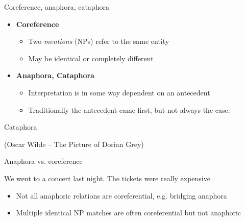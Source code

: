 \documentclass[dvipsnames, 10pt, compress]{beamer}
\begin{document}
\begin{frame}{Coreference, anaphora, cataphora}

\begin{itemize}
  \item  \textbf{Coreference} 
  \begin{itemize}  
    \item Two \emph{mentions} (NPs) refer to the same entity 
    \item May be identical or completely different
  \end{itemize}
  \item \textbf{Anaphora, Cataphora} 
  \begin{itemize}
    \item Interpretation is in some way dependent on an antecedent
    \item Traditionally the antecedent came first, but not always the case.
  \end{itemize}
\end{itemize}

\end{frame}


\begin{frame}{Cataphora}




(Oscar Wilde -- The Picture of Dorian Grey)
%

\end{frame}

\begin{frame}{Anaphora vs. coreference}

We went to a concert last night. The tickets were really expensive

\begin{itemize}
  \item Not all anaphoric relations are coreferential, e.g. bridging anaphora
  \item Multiple identical NP matches are often coreferential but not anaphoric
\end{itemize}

\end{frame}
\end{document}
